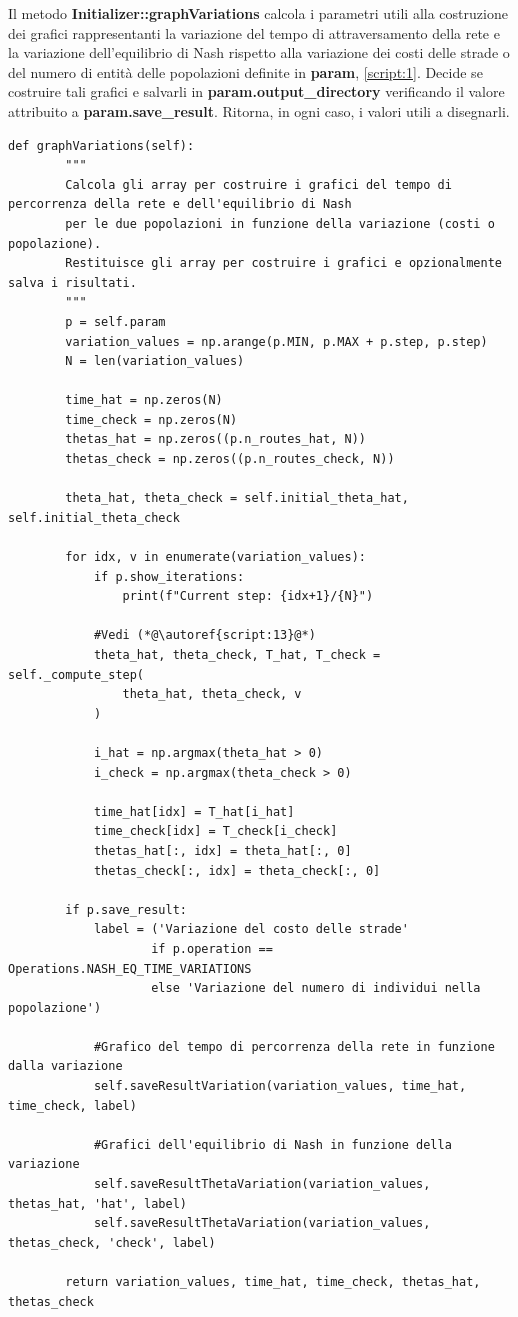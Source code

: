 Il metodo \textbf{Initializer::graphVariations} calcola i parametri utili alla costruzione dei grafici rappresentanti la variazione del tempo di 
attraversamento della rete e la variazione dell'equilibrio di Nash rispetto alla variazione dei costi delle strade o del numero di entità delle 
popolazioni definite in \textbf{param}, \autoref{script:1}. Decide se costruire tali grafici e salvarli in \textbf{param.output\_directory}
verificando il valore attribuito a \textbf{param.save\_result}. Ritorna, in ogni caso, i valori utili a disegnarli.

\begin{lstlisting}[style=myStile, caption={Initializer::graphVariations}, label={script:6}]
    def graphVariations(self):
        """
        Calcola gli array per costruire i grafici del tempo di percorrenza della rete e dell'equilibrio di Nash
        per le due popolazioni in funzione della variazione (costi o popolazione).
        Restituisce gli array per costruire i grafici e opzionalmente salva i risultati.
        """
        p = self.param
        variation_values = np.arange(p.MIN, p.MAX + p.step, p.step)
        N = len(variation_values)

        time_hat = np.zeros(N)
        time_check = np.zeros(N)
        thetas_hat = np.zeros((p.n_routes_hat, N))
        thetas_check = np.zeros((p.n_routes_check, N))

        theta_hat, theta_check = self.initial_theta_hat, self.initial_theta_check

        for idx, v in enumerate(variation_values):
            if p.show_iterations:
                print(f"Current step: {idx+1}/{N}")

            #Vedi (*@\autoref{script:13}@*)
            theta_hat, theta_check, T_hat, T_check = self._compute_step(
                theta_hat, theta_check, v
            )

            i_hat = np.argmax(theta_hat > 0)
            i_check = np.argmax(theta_check > 0)

            time_hat[idx] = T_hat[i_hat]
            time_check[idx] = T_check[i_check]
            thetas_hat[:, idx] = theta_hat[:, 0]
            thetas_check[:, idx] = theta_check[:, 0]

        if p.save_result:
            label = ('Variazione del costo delle strade'
                    if p.operation == Operations.NASH_EQ_TIME_VARIATIONS
                    else 'Variazione del numero di individui nella popolazione')

            #Grafico del tempo di percorrenza della rete in funzione dalla variazione
            self.saveResultVariation(variation_values, time_hat, time_check, label)
            
            #Grafici dell'equilibrio di Nash in funzione della variazione
            self.saveResultThetaVariation(variation_values, thetas_hat, 'hat', label)
            self.saveResultThetaVariation(variation_values, thetas_check, 'check', label)

        return variation_values, time_hat, time_check, thetas_hat, thetas_check
\end{lstlisting}

